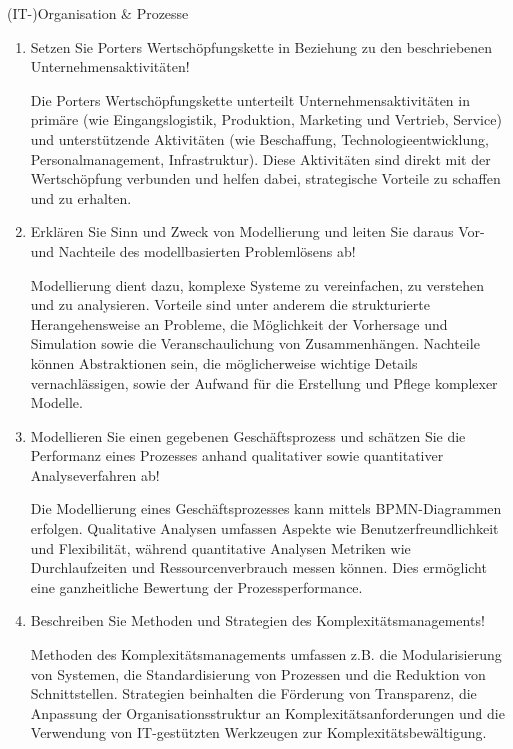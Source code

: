 \documentclass{article}
\begin{document}
\begin{exercise}{(IT-)Organisation \& Prozesse}
  \begin{enumerate}
    \item Setzen Sie Porters Wertschöpfungskette in Beziehung zu den beschriebenen Unternehmensaktivitäten!
          \begin{solution}
            Die Porters Wertschöpfungskette unterteilt Unternehmensaktivitäten in primäre (wie Eingangslogistik, Produktion, Marketing und Vertrieb, Service) und unterstützende Aktivitäten (wie Beschaffung, Technologieentwicklung, Personalmanagement, Infrastruktur). Diese Aktivitäten sind direkt mit der Wertschöpfung verbunden und helfen dabei, strategische Vorteile zu schaffen und zu erhalten.
          \end{solution}

    \item Erklären Sie Sinn und Zweck von Modellierung und leiten Sie daraus Vor- und Nachteile des modellbasierten Problemlösens ab!
          \begin{solution}
            Modellierung dient dazu, komplexe Systeme zu vereinfachen, zu verstehen und zu analysieren. Vorteile sind unter anderem die strukturierte Herangehensweise an Probleme, die Möglichkeit der Vorhersage und Simulation sowie die Veranschaulichung von Zusammenhängen. Nachteile können Abstraktionen sein, die möglicherweise wichtige Details vernachlässigen, sowie der Aufwand für die Erstellung und Pflege komplexer Modelle.
          \end{solution}

    \item Modellieren Sie einen gegebenen Geschäftsprozess und schätzen Sie die Performanz eines Prozesses anhand qualitativer sowie quantitativer Analyseverfahren ab!
          \begin{solution}
            Die Modellierung eines Geschäftsprozesses kann mittels BPMN-Diagrammen erfolgen. Qualitative Analysen umfassen Aspekte wie Benutzerfreundlichkeit und Flexibilität, während quantitative Analysen Metriken wie Durchlaufzeiten und Ressourcenverbrauch messen können. Dies ermöglicht eine ganzheitliche Bewertung der Prozessperformance.
          \end{solution}

    \item Beschreiben Sie Methoden und Strategien des Komplexitätsmanagements!
          \begin{solution}
            Methoden des Komplexitätsmanagements umfassen z.B. die Modularisierung von Systemen, die Standardisierung von Prozessen und die Reduktion von Schnittstellen. Strategien beinhalten die Förderung von Transparenz, die Anpassung der Organisationsstruktur an Komplexitätsanforderungen und die Verwendung von IT-gestützten Werkzeugen zur Komplexitätsbewältigung.
          \end{solution}


\end{enumerate}
\end{exercise}
\end{document}
